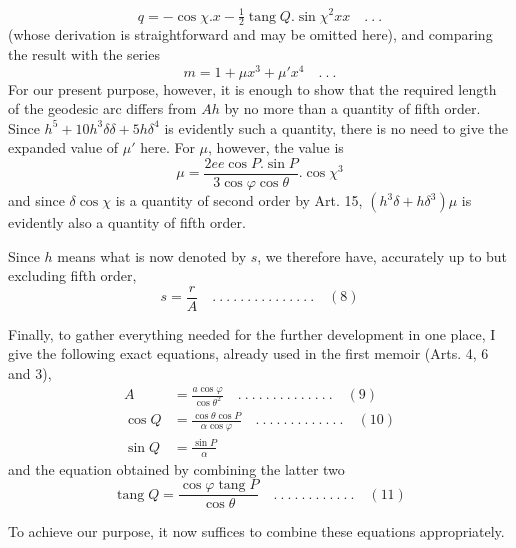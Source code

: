 \[
q=-\cos\chi\mathord{.}x-\tfrac12\operatorname{tang}Q\mathord{.}\sin\chi^2xx\quad .\ .\ .
\]
(whose derivation is straightforward and may be omitted here), and comparing the result with the series
\[
m=1+\mu x^3+\mu'x^4\quad .\ .\ .
\]
For our present purpose, however, it is enough to show that the required length of the geodesic arc differs from \(Ah\) by no more than a quantity of fifth order. Since \(h^5+10h^3\delta\delta+5h\delta^4\) is evidently such a quantity, there is no need to give the expanded value of \(\mu'\) here. For \(\mu\), however, the value is
\[
\mu=\frac{2ee\cos P\mathord{.}\sin P}{3\cos\varphi\cos\theta}\mathord{.}\cos\chi^3
\]
and since \(\delta\cos\chi\) is a quantity of second order by Art. 15, \((h^3\delta+h\delta^3)\mu\) is evidently also a quantity of fifth order.

Since \(h\) means what is now denoted by \(s\), we therefore have, accurately up to but excluding fifth order,
\[
s=\frac rA\quad .\ .\ .\ .\ .\ .\ .\ .\ .\ .\ .\ .\ .\ .\ .\quad(8)
\]

\indent Finally, to gather everything needed for the further development in one place, I give the following exact equations, already used in the first memoir (Arts. 4, 6 and 3),
\[
\begin{aligned}
A&=\frac{a\cos\varphi}{\cos\theta^2}\quad .\ .\ .\ .\ .\ .\ .\ .\ .\ .\ .\ .\ .\ .\quad(9)\\
\cos Q&=\frac{\cos\theta\cos P}{\alpha\cos\varphi}\quad .\ .\ .\ .\ .\ .\ .\ .\ .\ .\ .\ .\ .\quad(10)\\
\sin Q&=\frac{\sin P}{\alpha}
\end{aligned}
\]
and the equation obtained by combining the latter two
\[
\operatorname{tang}Q=\frac{\cos\varphi\operatorname{tang}P}{\cos\theta}\quad .\ .\ .\ .\ .\ .\ .\ .\ .\ .\ .\ .\quad(11)
\]

To achieve our purpose, it now suffices to combine these equations appropriately.
